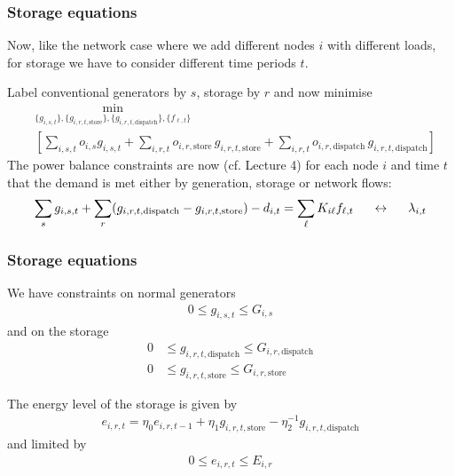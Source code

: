 \documentclass[10pt,dvipsnames]{beamer}
\def\l{\lambda}
\begin{document}
\begin{frame}[fragile]
  \frametitle{Storage equations}

  Now, like the network case where we add different nodes $i$
  with different loads, for storage we have to
  consider different time periods $t$.

  Label conventional generators by $s$, storage by $r$ and now minimise
  \begin{align*}
    &    \min_{\{g_{i,s,t}\},\{g_{i,r,t,\textrm{store}}\},\{g_{i,r,t,\textrm{dispatch}}\},\{f_{\ell,t}\}}\\
    &\left[  \sum_{i,s,t} o_{i,s} g_{i,s,t} +   \sum_{i,r,t} o_{i,r,\textrm{store} }\, g_{i,r,t,\textrm{store}} +   \sum_{i,r,t} o_{i,r,\textrm{dispatch}}\, g_{i,r,t,\textrm{dispatch}} \right]
  \end{align*}
  The power balance constraints are now (cf. Lecture 4) for each node $i$ and time $t$ that the demand is met either by generation, storage or network flows:
  \begin{align*}
    \sum_{s} g_{i,s,t} + \sum_{r}(g_{i,r,t,\textrm{dispatch}} - g_{i,r,t,\textrm{store}}) - d_{i,t} = \sum_\ell K_{i\ell}f_{\ell,t}  \hspace{0.5cm}\leftrightarrow\hspace{0.5cm} \l_{i,t}
  \end{align*}
\end{frame}

\begin{frame}[fragile]
  \frametitle{Storage equations}

  We have constraints on normal generators
    \begin{align*}
        0 \leq g_{i,s,t}  \leq  G_{i,s}
  \end{align*}
    and on the storage
    \begin{align*}
    0 & \leq g_{i,r,t,\textrm{dispatch}} \leq G_{i,r,\textrm{dispatch}} \\
    0 & \leq g_{i,r,t,\textrm{store}} \leq G_{i,r,\textrm{store}}
    \end{align*}

    The energy level of the storage is given by
  \begin{align*}
    e_{i,r,t} = \eta_0e_{i,r,t-1} + \eta_1g_{i,r,t,\textrm{store}} -  \eta_2^{-1} g_{i,r,t,\textrm{dispatch}}
  \end{align*}
  and limited by
  \begin{align*}
    0 \leq e_{i,r,t} \leq E_{i,r}
  \end{align*}

\end{frame}
\end{document}
